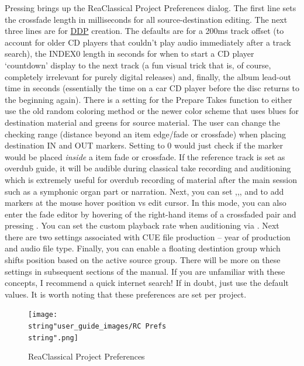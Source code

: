 \documentclass[10pt,american]{article}
\begin{document}
Pressing  brings up the ReaClassical Project Preferences dialog. The
first line sets the crossfade length in milliseconds for all source-destination
editing. The next three lines are for
\href{https://en.wikipedia.org/wiki/Disc_Description_Protocol}{DDP} creation.
The defaults are for a 200ms track offset (to account for older CD players that
couldn't play audio immediately after a track search), the INDEX0 length in
seconds for when to start a CD player `countdown' display to the next track (a
fun visual trick that is, of course, completely irrelevant for purely digital
releases) and, finally, the album lead-out time in seconds (essentially the time
on a car CD player before the disc returns to the beginning again). There is a
setting for the Prepare Takes function to either use the old random coloring
method or the newer color scheme that uses blues for destination material and
greens for source material. The user can change the checking range (distance
beyond an item edge/fade or crossfade) when placing destination IN and OUT
markers. Setting to 0 would just check if the marker would be placed
\emph{inside} a item fade or crossfade. If the reference track is set as overdub
guide, it will be audible during classical take recording and auditioning which
is extremely useful for overdub recording of material after the main session
such as a symphonic organ part or narration. Next, you can set
,,, and  to add markers at the mouse hover
position vs edit cursor. In this mode, you can also enter the fade editor by
hovering of the right-hand items of a crossfaded pair and pressing . You
can set the custom playback rate when auditioning via . Next
there are two settings associated with CUE file production -- year of production
and audio file type. Finally, you can enable a floating destintion group which
shifts position based on the active source group. There will be more on these
settings in subsequent sections of the manual. If you are unfamiliar with these
concepts, I recommend a quick internet search! If in doubt, just use the default
values. It is worth noting that these preferences are set per project.

\begin{figure}
\begin{centering}
\texttt{[image: \\string"user\_guide\_images/RC Prefs\\string".png]}
\par\end{centering}
\caption{ReaClassical Project Preferences}
\end{figure}
\end{document}

